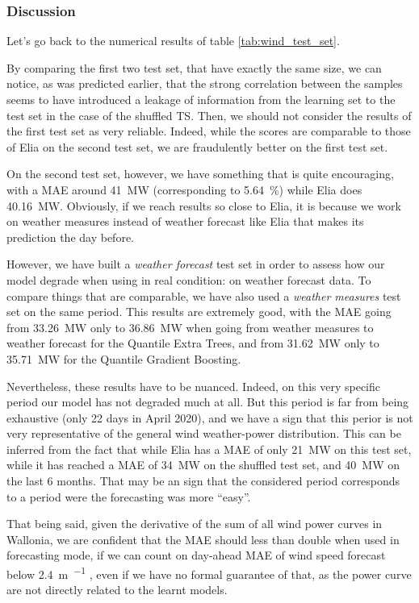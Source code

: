 \documentclass[a4paper, 12pt]{article}
\begin{document}
	\subsubsection{Discussion}
	Let's go back to the numerical results of table \ref{tab:wind_test_set}.

	By comparing the first two test set, that have exactly the same size, we can notice, as was predicted earlier, that the strong correlation between the samples seems to have introduced a leakage of information from the learning set to the test set in the case of the shuffled TS. Then, we should not consider the results of the first test set as very reliable. Indeed, while the scores are comparable to those of Elia on the second test set, we are fraudulently better on the first test set.

	On the second test set, however, we have something that is quite encouraging, with a MAE around \SI{41}{\mega\watt} (corresponding to \SI{5.64}{\percent}) while Elia does \SI{40.16}{\mega\watt}. Obviously, if we reach results so close to Elia, it is because we work on weather measures instead of weather forecast like Elia that makes its prediction the day before.

	However, we have built a \emph{weather forecast} test set in order to assess how our model degrade when using in real condition: on weather forecast data. To compare things that are comparable, we have also used a \emph{weather measures} test set on the same period. This results are extremely good, with the MAE going from \SI{33.26}{\mega\watt} only to \SI{36.86}{\mega\watt} when going from weather measures to weather forecast for the Quantile Extra Trees, and from \SI{31.62}{\mega\watt} only to \SI{35.71}{\mega\watt} for the Quantile Gradient Boosting.

	Nevertheless, these results have to be nuanced. Indeed, on this very specific period our model has not degraded much at all. But this period is far from being exhaustive (only 22 days in April 2020), and we have a sign that this perior is not very representative of the general wind weather-power distribution. This can be inferred from the fact that while Elia has a MAE of only \SI{21}{\mega\watt} on this test set, while it has reached a MAE of \SI{34}{\mega\watt} on the shuffled test set, and \SI{40}{\mega\watt} on the last 6 months. That may be an sign that the considered period corresponds to a period were the forecasting was more “easy”.

	That being said, given the derivative of the sum of all wind power curves in Wallonia, we are confident that the MAE should less than double when used in forecasting mode, if we can count on day-ahead MAE of wind speed forecast below \SI{2.4}{\meter\per{\second}} \parencite{el-fouly2008wind}, even if we have no formal guarantee of that, as the power curve are not directly related to the learnt models.
	
\end{document}
